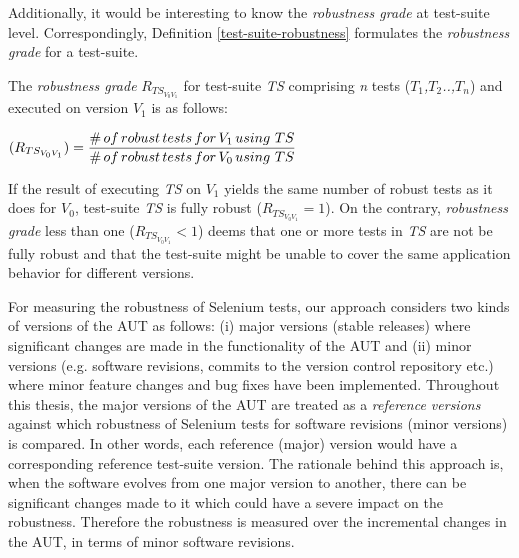 Additionally, it would be interesting to know the \textit{
robustness grade} at test-suite level. Correspondingly, Definition \ref{test-suite-robustness} formulates the \textit{
robustness grade} for a test-suite.

\theoremstyle{definition}
\begin{definition}{The \textit{robustness grade} $R_{TS_{V_{0}V_{1}}}$ for test-suite \textit{TS} comprising \textit{n} tests (\textit{$T_1$,$T_2$..,$T_n$}) and executed on version \textit{$V_{1}$} is as follows:}
\vspace{0.5cm}
\begin{center}
$(R_{TS_{V_{0}V_{1}}}) = \displaystyle \frac{\#\thinspace of \thinspace robust \thinspace tests \thinspace for \thinspace V_{1} \thinspace using \thinspace \thinspace TS}{\# \thinspace of \thinspace robust \thinspace tests \thinspace for  \thinspace V_{0} \thinspace using \thinspace \thinspace TS}$ \normalsize
\end{center}
\label{test-suite-robustness}
\end{definition}

If the result of executing \textit{TS} on \textit{$V_{1}$} yields the same number of robust tests as it does for \textit{$V_{0}$}, test-suite \textit{TS} is fully robust ($R_{TS_{V_{0}V_{1}}} =1$). On the contrary, \textit{
robustness grade} less than one ($R_{TS_{V_{0}V_{1}}} < 1$) deems that one or more tests in \textit{TS} are not be fully robust and that the test-suite might be unable to cover the same application behavior for different versions. 

For measuring the robustness of Selenium tests, our approach considers two kinds of versions of the AUT as follows: (i) major versions (stable releases) where significant changes are made in the functionality of the AUT and (ii) minor versions (e.g. software revisions, commits to the version control repository etc.) where minor feature changes and bug fixes have been implemented. Throughout this thesis, the major versions of the AUT are treated as a \textit{reference versions} against which robustness of Selenium tests for software revisions (minor versions) is compared. In other words, each reference (major) version would have a corresponding reference test-suite version. The rationale behind this approach is, when the software evolves from one major version to another, there can be significant changes made to it which could have a severe impact on the robustness. Therefore the robustness is measured over the incremental changes in the AUT, in terms of minor software revisions.  

